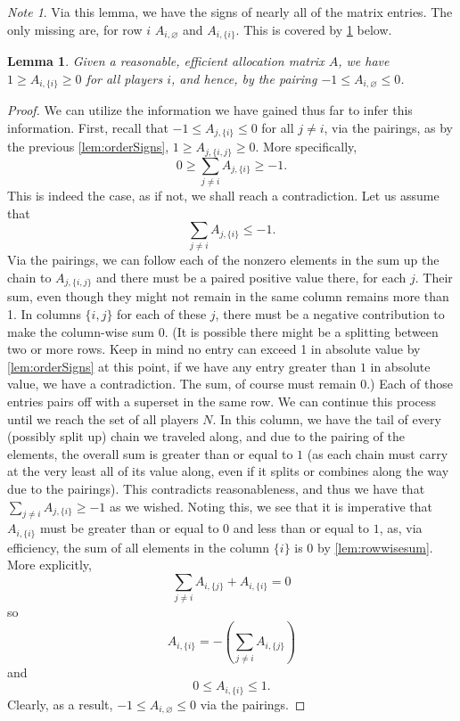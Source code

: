 \documentclass[12pt,letterpaper,final]{article}
\theoremstyle{plain}
\theoremstyle{plain}
\theoremstyle{plain}
\newtheorem{lemma}[theorem]{Lemma}
\theoremstyle{plain}
\theoremstyle{plain}
\theoremstyle{plain}
\theoremstyle{plain}
\theoremstyle{definition}
\theoremstyle{definition}
\theoremstyle{definition}
\theoremstyle{definition}
\theoremstyle{definition}
\theoremstyle{remark}
\theoremstyle{remark}
\newtheorem*{note}{Note}
\theoremstyle{remark}
\theoremstyle{remark}
\begin{document}
\begin{note}
  Via this lemma, we have the signs of nearly all of the matrix
  entries. The only missing are, for row \(i\) \(A_{i,\varnothing}\)
  and \(A_{i,\{i\}}\). This is covered by \cref{lem:lastcolumnBd}
  below.
\end{note}

\begin{lemma}\label{lem:lastcolumnBd}\label{lem:column1upperBd}
  Given a reasonable, efficient allocation matrix \(A\), we have
  \(1\geq A_{i,\{i\}} \geq 0\) for all players \(i\), and hence, by the pairing
  \(-1\leq A_{i,\varnothing} \leq 0\).
\end{lemma}

\begin{proof}
  We can utilize the information we have gained thus far to infer this
  information. First, recall that \(-1\leq A_{j,\{i\}} \leq 0\) for all
  \(j\neq i\), via the pairings, as by the previous
  \cref{lem:orderSigns}, \(1\geq A_{j,\{i,j\}} \geq 0\). More
  specifically,
  \[
    0\geq \sum_{j\neq i} A_{j,\{i\}} \geq -1.
  \]
  This is indeed the case, as if not, we shall reach a contradiction.
  Let us assume that
  \[
    \sum_{j\neq i} A_{j,\{i\}} \leq -1.
  \]
  Via the pairings, we can follow each of the nonzero elements in the
  sum up the chain to \(A_{j,\{i,j\}}\) and there must be a paired
  positive value there, for each \(j\). Their sum, even though they
  might not remain in the same column remains more than 1. In columns
  \(\{i,j\}\) for each of these \(j\), there must be a negative
  contribution to make the column-wise sum 0. (It is possible there
  might be a splitting between two or more rows. Keep in mind no entry
  can exceed 1 in absolute value by \cref{lem:orderSigns} at this
  point, if we have any entry greater than \(1\) in absolute value, we
  have a contradiction. The sum, of course must remain 0.) Each of
  those entries pairs off with a superset in the same row. We can
  continue this process until we reach the set of all players
  \(N\). In this column, we have the tail of every (possibly split up)
  chain we traveled along, and due to the pairing of the elements, the
  overall sum is greater than or equal to \(1\) (as each chain must
  carry at the very least all of its value along, even if it splits or
  combines along the way due to the pairings).  This contradicts
  reasonableness, and thus we have that
  \(\sum_{j\neq i} A_{j,\{i\}} \geq -1\) as we wished.
  Noting this, we see
  that it is imperative that \(A_{i,\{i\}}\) must be greater than or
  equal to \(0\) and less than or equal to \(1\), as, via efficiency,
  the sum of all elements in the column \(\{i\}\)
  is \(0\) by \cref{lem:rowwisesum}. More explicitly,
  \[
    \sum_{j\neq i} A_{i,\{j\}} + A_{i,\{i\}} = 0
  \]
  so
  \[
    A_{i,\{i\}} = -\left(\sum_{j\neq i} A_{i,\{j\}} \right)
  \]
  and
  \[
    0 \leq A_{i,\{i\}} \leq 1.
  \]
  Clearly, as a result,
  \(-1 \leq A_{i,\varnothing} \leq 0\) via the pairings.
\end{proof}
\end{document}
